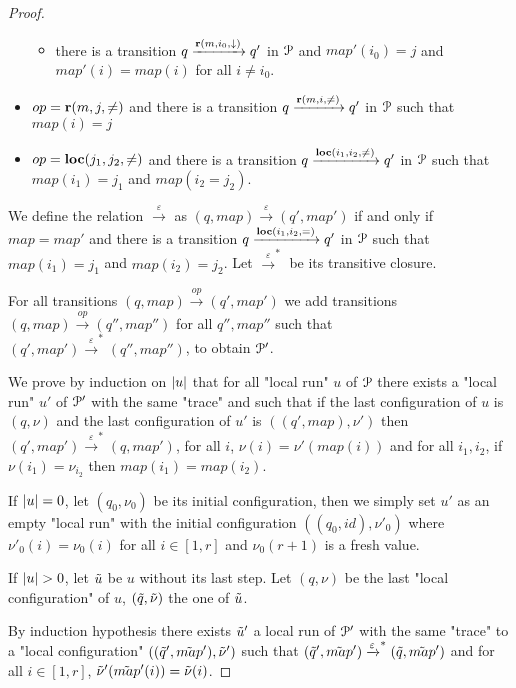 \begin{proof}
\begin{itemize}
\begin{itemize}
			\item there is a transition $q \xrightarrow{\textbf{r}(m, i_0, \downarrow)} q'$ in $\mathcal{P}$ and $map'(i_0)=j$ and $map'(i) = map(i)$ for all $i \neq i_0$.
		\end{itemize} 
		
		\item $op = \textbf{r}(m, j, {\ne})$ and there is a transition $q \xrightarrow{\textbf{r}(m, i, {\ne})} q'$ in $\mathcal{P}$ such that $map(i)=j$
		
		\item $op=\textbf{loc}(j_1,j_2,{\ne})$ and there is a transition $q \xrightarrow{\textbf{loc}(i_1,i_2,{\ne})} q'$ in $\mathcal{P}$ such that $map(i_1)=j_1$ and $map(i_2 = j_2)$.
	\end{itemize}

	
	We define the relation $\xrightarrow{\varepsilon}$ as $(q, map) \xrightarrow{\varepsilon} (q', map')$ if and only if $map=map'$ and there is a transition $q \xrightarrow{\textbf{loc}(i_1,i_2,{=})} q'$ in $\mathcal{P}$ such that $map(i_1)=j_1$ and $map(i_2) = j_2$.
	Let $\xrightarrow{\varepsilon}^*$ be its transitive closure.
	
	For all transitions $(q,map) \xrightarrow{op} (q', map')$ we add transitions $(q,map) \xrightarrow{op} (q'', map'')$ for all $q'', map''$ such that $(q', map') \xrightarrow{\varepsilon}^* (q'', map'')$, to obtain $\mathcal{P}'$.
	
	We prove by induction on $|u|$ that for all "local run" $u$ of $\mathcal{P}$ there exists a "local run" $u'$ of $\mathcal{P}'$ with the same "trace" and such that if the last configuration of $u$ is $(q,\nu)$ and the last configuration of $u'$ is $((q',map), \nu')$ then $(q', map') \xrightarrow{\varepsilon}^* (q, map')$, for all $i$, $\nu(i) = \nu'(map(i))$ and for all $i_1, i_2$, if $\nu(i_1)=\nu_{i_2}$ then $map(i_1) = map(i_2)$.  
	
	If $|u| = 0$, let $(q_0, \nu_0)$ be its initial configuration, then we simply set $u'$ as an empty "local run" with the initial configuration $((q_0, id), \nu'_0)$ where $\nu'_0(i) = \nu_0(i)$ for all $i \in [1,r]$ and $\nu_0(r+1)$ is a fresh value.
	
	If $\size{u}>0$, let $\Tilde{u}$ be $u$ without its last step. Let $(q, \nu)$ be the last "local configuration" of $u$, $(\Tilde{q}, \Tilde{\nu})$ the one of $\Tilde{u}$.
	
	By induction hypothesis there exists $\Tilde{u}'$ a local run of $\mathcal{P}'$ with the same "trace" to a "local configuration" $((\Tilde{q}', \Tilde{map}'), \Tilde{\nu}')$ such that $(\Tilde{q}', \Tilde{map}') \xrightarrow{\varepsilon}^* (\Tilde{q}, \Tilde{map}')$ and for all $i \in [1,r]$, $\Tilde{\nu}'(\Tilde{map}'(i)) = \Tilde{\nu}(i)$.
	

\end{proof}
